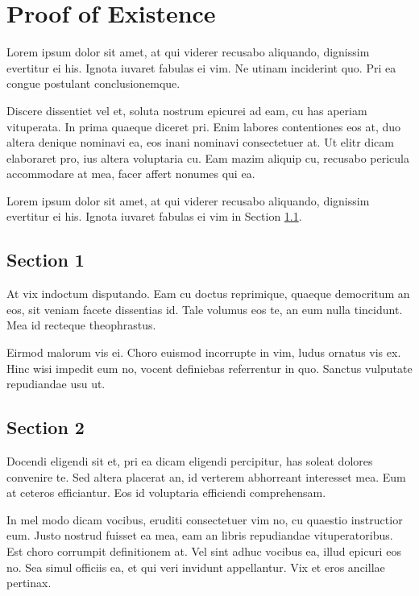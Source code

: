 \cleartooddpage[\thispagestyle{empty}]
\chapter{Proof of Existence}\label{APPENDIXA}

Lorem ipsum dolor sit amet, at qui viderer recusabo aliquando, dignissim
evertitur ei his. Ignota iuvaret fabulas ei vim. Ne utinam inciderint quo.
Pri ea congue postulant conclusionemque.

Discere dissentiet vel et, soluta nostrum epicurei ad eam, cu has aperiam
vituperata. In prima quaeque diceret pri. Enim labores contentiones eos at,
duo altera denique nominavi ea, eos inani nominavi consectetuer at. Ut elitr
dicam elaboraret pro, ius altera voluptaria cu. Eam mazim aliquip cu,
recusabo pericula accommodare at mea, facer affert nonumes qui ea.

Lorem ipsum dolor sit amet, at qui viderer recusabo aliquando, dignissim
evertitur ei his. Ignota iuvaret fabulas ei vim in 
Section \ref{APPENDIXA_SECTION1}.

\section{Section 1}\label{APPENDIXA_SECTION1}

At vix indoctum disputando. Eam cu doctus reprimique, quaeque democritum
an eos, sit veniam facete dissentias id. Tale volumus eos te, an eum nulla
tincidunt. Mea id recteque theophrastus.

Eirmod malorum vis ei. Choro euismod incorrupte in vim, ludus ornatus vis ex.
Hinc wisi impedit eum no, vocent definiebas referrentur in quo. Sanctus
vulputate repudiandae usu ut.

\section{Section 2}\label{APPENDIXA_SECTION2}

Docendi eligendi sit et, pri ea dicam eligendi percipitur, has soleat
dolores convenire te. Sed altera placerat an, id verterem abhorreant
interesset mea. Eum at ceteros efficiantur. Eos id voluptaria efficiendi
comprehensam.

In mel modo dicam vocibus, eruditi consectetuer vim no, cu quaestio
instructior eum. Justo nostrud fuisset ea mea, eam an libris repudiandae
vituperatoribus. Est choro corrumpit definitionem at. Vel sint adhuc vocibus
ea, illud epicuri eos no. Sea simul officiis ea, et qui veri invidunt
appellantur. Vix et eros ancillae pertinax.
